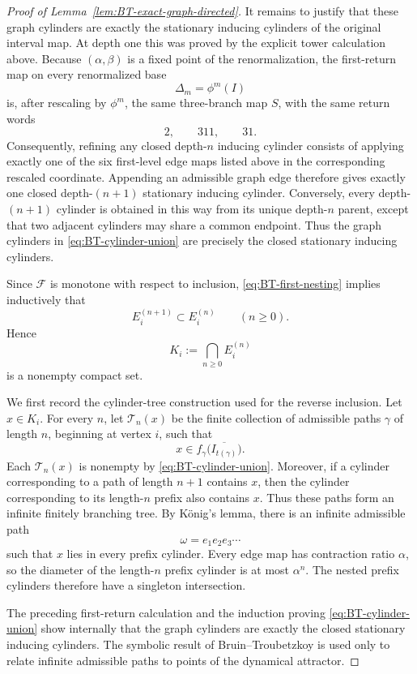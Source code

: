 \documentclass[11pt]{amsart}
\theoremstyle{plain}
\theoremstyle{definition}
\theoremstyle{remark}
\begin{document}
\begin{proof}[Proof of Lemma~\ref{lem:BT-exact-graph-directed}]
It remains to justify that these graph cylinders are exactly the stationary
inducing cylinders of the original interval map. At depth one this was
proved by the explicit tower calculation above. Because \((\alpha,\beta)\)
is a fixed point of the renormalization, the first-return map on every
renormalized base
\[
        \Delta_m=\phi^m(I)
\]
is, after rescaling by \(\phi^m\), the same three-branch map \(S\), with
the same return words
\[
        2,\qquad311,\qquad31.
\]
Consequently, refining any closed depth-\(n\) inducing cylinder consists
of applying exactly one of the six first-level edge maps listed above in
the corresponding rescaled coordinate. Appending an admissible graph edge
therefore gives exactly one closed depth-\((n+1)\) stationary inducing
cylinder. Conversely, every depth-\((n+1)\) cylinder is obtained in this
way from its unique depth-\(n\) parent, except that two adjacent cylinders
may share a common endpoint. Thus the graph cylinders in
\eqref{eq:BT-cylinder-union} are precisely the closed stationary inducing
cylinders.

Since \(\mathcal F\) is monotone with respect to inclusion,
\eqref{eq:BT-first-nesting} implies inductively that
\[
        E_i^{(n+1)}\subset E_i^{(n)}
        \qquad
        (n\geq0).
\]
Hence
\[
        K_i:=\bigcap_{n\geq0}E_i^{(n)}
\]
is a nonempty compact set.

We first record the cylinder-tree construction used for the reverse
inclusion. Let \(x\in K_i\). For every \(n\), let
\(\mathscr T_n(x)\) be the finite collection of admissible paths
\(\gamma\) of length \(n\), beginning at vertex \(i\), such that
\[
        x\in
        f_\gamma
        \bigl(\overline{I_{t(\gamma)}}\bigr).
\]
Each \(\mathscr T_n(x)\) is nonempty by
\eqref{eq:BT-cylinder-union}. Moreover, if a cylinder corresponding to a
path of length \(n+1\) contains \(x\), then the cylinder corresponding to
its length-\(n\) prefix also contains \(x\). Thus these paths form an
infinite finitely branching tree. By K\"onig's lemma, there is an infinite
admissible path
\[
        \omega=e_1e_2e_3\cdots
\]
such that \(x\) lies in every prefix cylinder. Every edge map has
contraction ratio \(\alpha\), so the diameter of the length-\(n\) prefix
cylinder is at most \(\alpha^n\). The nested prefix cylinders therefore
have a singleton intersection.

The preceding first-return calculation and the induction proving
\eqref{eq:BT-cylinder-union} show internally that the graph cylinders are
exactly the closed stationary inducing cylinders. The symbolic result of
Bruin--Troubetzkoy is used only to relate infinite admissible paths to
points of the dynamical attractor.


\end{proof}
\end{document}

